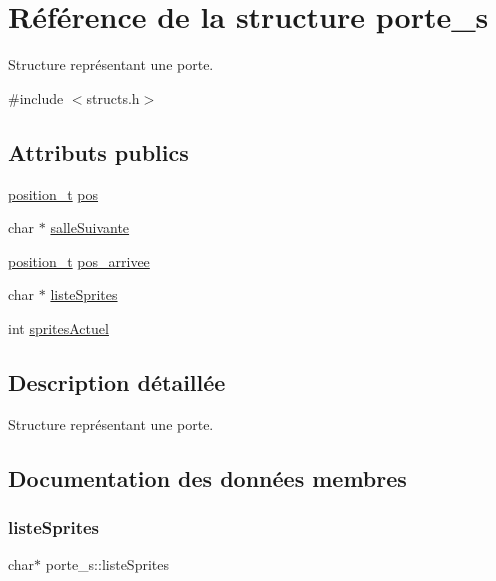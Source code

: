 \hypertarget{structporte__s}{}\section{Référence de la structure porte\+\_\+s}
\label{structporte__s}


Structure représentant une porte.  




{\ttfamily \#include $<$structs.\+h$>$}

\subsection*{Attributs publics}
\begin{DoxyCompactItemize}
\item 
\hyperlink{structposition__s}{position\+\_\+t} \hyperlink{structporte__s_a9e3c1bbfc207fb5ae26ed3c348ae9602}{pos}
\item 
char $\ast$ \hyperlink{structporte__s_ae89eb735de3e232b85236a603bf004d4}{salle\+Suivante}
\item 
\hyperlink{structposition__s}{position\+\_\+t} \hyperlink{structporte__s_a5f0b093b4c08255187a3dd261ff9e638}{pos\+\_\+arrivee}
\item 
char $\ast$ \hyperlink{structporte__s_aa55e29e3a22ae8711ea6ff4de335feee}{liste\+Sprites}
\item 
int \hyperlink{structporte__s_aac069c5b47ed31b2716a3571f0a069e6}{sprites\+Actuel}
\end{DoxyCompactItemize}


\subsection{Description détaillée}
Structure représentant une porte. 

\subsection{Documentation des données membres}
\mbox{\label{structporte__s_aa55e29e3a22ae8711ea6ff4de335feee}} 
\subsubsection{\texorpdfstring{liste\+Sprites}{listeSprites}}
{\footnotesize\ttfamily char$\ast$ porte\+\_\+s\+::liste\+Sprites}

